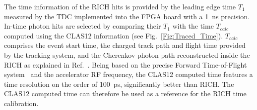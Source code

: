 \documentclass[5p,times,twocolumn]{elsarticle}
\begin{document}
The time information of the RICH hits is provided by the leading edge time $T_1$ measured by the TDC implemented
into the FPGA board with a 1~ns precision. In-time photon hits are selected by comparing their $T_1$ with the time
$T_{calc}$ computed using the CLAS12 information (see Fig.~\ref{Fig:Traced_Time}). $T_{calc}$ comprises the event
start time, the charged track path and flight time provided by the tracking system, and the Cherenkov photon path
reconstructed inside the RICH as explained in Ref.~\cite{recon-nim}. Being based on the precise Forward Time-of-Flight
system~\cite{REF:ftof-nim} and the accelerator RF frequency, the CLAS12 computed time features a time resolution on the order of 100~ps,
significantly better than RICH. The CLAS12 computed time can therefore be used as a reference for the RICH time calibration.
\end{document}
